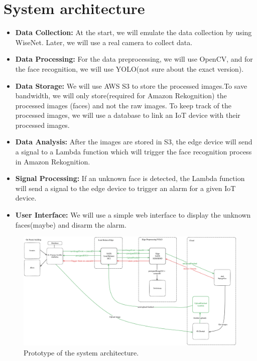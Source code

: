 \documentclass[conference]{IEEEtran}
\begin{document}
\section{System architecture}
\begin{itemize}
    \item \textbf{Data Collection:} At the start, we will emulate the data collection by using WiseNet. Later, we will use a real camera to collect data.
    \item \textbf{Data Processing:} For the data preprocessing, we will use OpenCV, and for the face recognition, we will use YOLO(not sure about the exact version).
    \item \textbf{Data Storage:} We will use AWS S3 to store the processed images.To save bandwidth, we will only store(required for Amazon Rekognition) the processed images (faces) 
                                    and not the raw images. To keep track of the processed images, we will use a database to link an IoT device with their processed images.
    \item \textbf{Data Analysis:} After the images are stored in S3, the edge device will send a signal to a Lambda function which will trigger the face recognition 
                                    process in Amazon Rekognition.
    \item \textbf{Signal Processing:} If an unknown face is detected, the Lambda function will send a signal to the edge device to trigger an alarm for a given IoT device.
    \item \textbf{User Interface:} We will use a simple web interface to display the unknown faces(maybe) and disarm the alarm.
\end{itemize}

\begin{figure}[h!]
    \centering
    \includegraphics[width=1\linewidth]{images/architecturev2.excalidraw.png}
    \caption{Prototype of the system architecture.}
    \label{fig:enter-label}
\end{figure}
\end{document}
